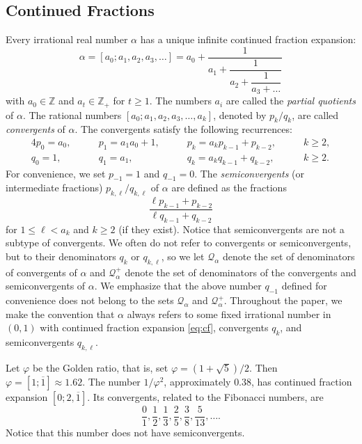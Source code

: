 \documentclass[a4paper,fleqn]{article}
\newcommand{\qk}[1]{\mathcal{Q}_{#1}}
\newcommand{\qkl}[1]{\mathcal{Q}^+_{#1}}
\newcommand{\Z}{\mathbb{Z}}
\begin{document}
  \subsection{Continued Fractions}
  Every irrational real number $\alpha$ has a unique infinite continued fraction expansion:
  \begin{equation}\label{eq:cf}
    \alpha = [a_0; a_1, a_2, a_3, \ldots] = a_0 + \dfrac{1}{a_1 + \dfrac{1}{a_2 + \dfrac{1}{a_3 + \ldots}}}
  \end{equation}
  with $a_0 \in \Z$ and $a_t \in \Z_+$ for $t \geq 1$. The numbers $a_i$ are called the \emph{partial
  quotients} of $\alpha$. The rational numbers $[a_0; a_1, a_2, a_3, \ldots, a_k]$, denoted by $p_k / q_k$, are called
  \emph{convergents} of $\alpha$. The convergents satisfy the following recurrences:
  \begin{alignat*}{4}
    p_0 = a_0, &\qquad p_1 = a_1 a_0 + 1, &\qquad p_k = a_k p_{k-1} + p_{k-2}, \qquad& k \geq 2, \\
    q_0 = 1,   &\qquad q_1 = a_1,         &\qquad q_k = a_k q_{k-1} + q_{k-2}, \qquad& k \geq 2.
  \end{alignat*}  
  For convenience, we set $p_{-1} = 1$ and $q_{-1} = 0$. The \emph{semiconvergents} (or intermediate fractions)
  $p_{k,\ell} / q_{k,\ell}$ of $\alpha$ are defined as the fractions
  \begin{equation*}
    \frac{ \ell p_{k-1} + p_{k-2} }{ \ell q_{k-1} + q_{k-2} }
  \end{equation*}
  for $1 \leq \ell < a_k$ and $k \geq 2$ (if they exist). Notice that semiconvergents are not a subtype of convergents.
  We often do not refer to convergents or semiconvergents, but to their denominators $q_k$ or $q_{k,\ell}$, so we let
  $\qk{\alpha}$ denote the set of denominators of convergents of $\alpha$ and $\qkl{\alpha}$ denote the set of
  denominators of the convergents and semiconvergents of $\alpha$. We emphasize that the above number $q_{-1}$ defined
  for convenience does not belong to the sets $\qk{\alpha}$ and $\qkl{\alpha}$. Throughout the paper, we make the
  convention that $\alpha$ always refers to some fixed irrational number in $(0, 1)$ with continued fraction expansion
  \eqref{eq:cf}, convergents $q_k$, and semiconvergents $q_{k,\ell}$.

  \begin{example}
    Let $\varphi$ be the Golden ratio, that is, set $\varphi = (1 + \sqrt{5})/2$. Then
    $\varphi = [1; \overline{1}] \approx 1.62$. The number $1/\varphi^2$, approximately $0.38$, has continued fraction
    expansion $[0; 2, \overline{1}]$. Its convergents, related to the Fibonacci numbers, are
    \begin{equation*}
      \frac{0}{1}, \frac{1}{2}, \frac{1}{3}, \frac{2}{5}, \frac{3}{8}, \frac{5}{13}, \ldots.
    \end{equation*}
    Notice that this number does not have semiconvergents.
  \end{example}
\end{document}
